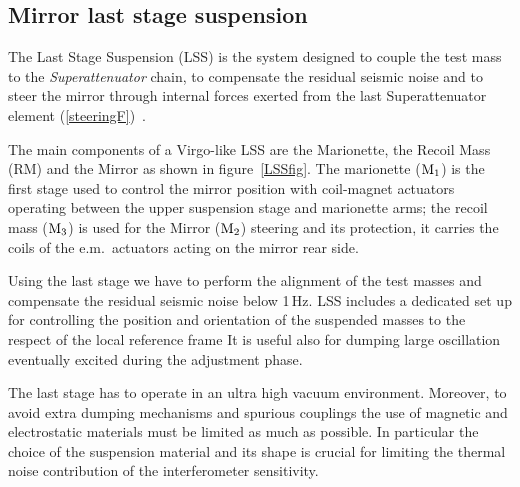
%




\FloatBarrier
\subsection{Mirror last stage suspension}
\label{sec:last_stage}


The Last Stage Suspension (LSS) is the system designed to couple the test mass to the \emph{Superattenuator} chain, to compensate the residual seismic noise and to steer the mirror through internal forces exerted from the last Superattenuator element (\ref{steeringF})~\cite{LSSpaper1999}.

The main components of a Virgo-like LSS are the Marionette, the Recoil Mass (RM)  and the Mirror as shown in figure~\ref{LSSfig}.
The marionette  ($\rm M_1$) is the first stage used to control the mirror position with coil-magnet actuators operating between the upper suspension stage
and marionette arms; the recoil mass ($\rm M_3$)  is used for the Mirror ($\rm M_2$) steering and its protection, it carries the coils of the e.m.\ actuators acting on the mirror rear side.



Using the last stage we have to perform the alignment  of the test masses and compensate the residual seismic noise below 1\,Hz.
LSS includes  a dedicated  set up for controlling  the position and orientation of the suspended masses to the respect of the local reference frame It is useful   also  for dumping  large oscillation eventually excited during the adjustment phase. 

\noindent
The last stage has to operate in  an ultra high vacuum environment. Moreover, to avoid extra dumping mechanisms and spurious couplings  the use of magnetic and electrostatic materials must be limited as much as possible. In particular the choice of the suspension material and its shape   is crucial for limiting  the thermal noise contribution of the interferometer sensitivity.

